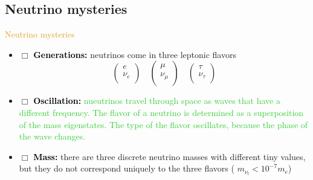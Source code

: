 \documentclass[11pt]{beamer} %
\renewcommand{\(}{\begin{columns}}
\renewcommand{\)}{\end{columns}}
\newcommand{\<}[1]{\begin{column}{#1}}
\renewcommand{\>}{\end{column}}
\newcommand{\itt}{\begin{itemize}}
\newcommand{\tti}{\end{itemize}}
\newcommand{\hlt}[2]{\textcolor{#1}{\textbf{#2}}}
\begin{document}
\subsection{Neutrino mysteries}
\begin{frame}{\textcolor{Goldenrod}{Neutrino mysteries}}
\itt[<+->]
\item[$\Box$] \hlt{black}{Generations:} neutrinos come in three leptonic flavors
  \[
    \begin{pmatrix}
      e \\ \nu_e \\
    \end{pmatrix}
    \quad
    \begin{pmatrix}
      \mu \\ \nu_{\mu} \\
    \end{pmatrix}
    \quad 
    \begin{pmatrix}
      \tau \\ \nu_{\tau} \\
    \end{pmatrix}
  \]

\item[$\Box$] \hlt{black}{Oscillation:} \textcolor{LimeGreen}{nueutrinos
    travel through space as waves that have a different frequency. The
    flavor of a neutrino is determined as a superposition of the mass
    eigenstates. The type of the flavor oscillates, because the phase of
    the wave changes.}
\item[$\Box$] \hlt{black}{Mass:} there are three discrete neutrino
  masses with different tiny values, \alert{but they do not correspond
    uniquely to the three flavors ( $m_{\nu_{l}} < 10^{-7} m_e$)}
  
  \tti
\end{frame}
\end{document}
